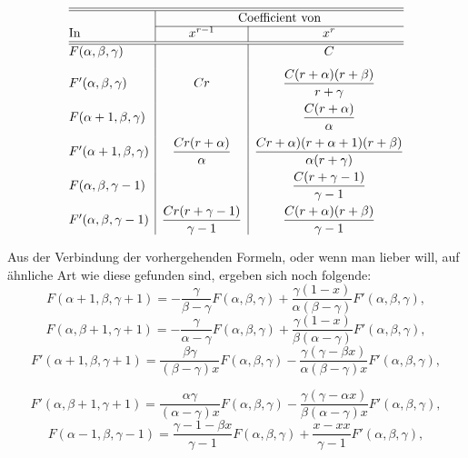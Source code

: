 \begingroup\renewcommand{\arraystretch}{1.45}
\[\begin{array}{@{}l|c|c@{}}
\hline\hline
&\multicolumn{2}{c}{\text{Coefficient von}}\\\cline{2-3}
\text{In}&x^{r-1}&x^r\\\hline\hline
F(\alpha,\beta,\gamma)&&C\\[.7em]
F'(\alpha,\beta,\gamma)&Cr&\dfrac{C(r+\alpha)(r+\beta)}{r+\gamma}\\[.9em]
F(\alpha+1,\beta,\gamma)&&\dfrac{C(r+\alpha)}{\alpha}\\[.9em]
F'(\alpha+1,\beta,\gamma)&\dfrac{Cr(r+\alpha)}{\alpha}&\dfrac{Cr+\alpha)(r+\alpha+1)(r+\beta)}{\alpha(r+\gamma)}\\[.9em]
F(\alpha,\beta,\gamma-1)&&\dfrac{C(r+\gamma-1)}{\gamma-1}\\[.9em]
F'(\alpha,\beta,\gamma-1)&\dfrac{Cr(r+\gamma-1)}{\gamma-1}&\dfrac{C(r+\alpha)(r+\beta)}{\gamma-1}
\end{array}\]
\endgroup
\par\indent Aus der Verbindung der vorhergehenden Formeln, oder wenn man lieber will, auf ähnliche Art wie diese gefunden sind, ergeben sich noch folgende:
\begin{equation}
F(\alpha+1,\beta,\gamma+1)=-\frac{\gamma}{\beta-\gamma}F(\alpha,\beta,\gamma)+\frac{\gamma(1-x)}{\alpha(\beta-\gamma)}F'(\alpha,\beta,\gamma),\tag*{(14)}
\end{equation}
\begin{equation}
F(\alpha,\beta+1,\gamma+1)=-\frac{\gamma}{\alpha-\gamma}F(\alpha,\beta,\gamma)+\frac{\gamma(1-x)}{\beta(\alpha-\gamma)}F'(\alpha,\beta,\gamma),\tag*{(15)}
\end{equation}
\begin{equation}
F'(\alpha+1,\beta,\gamma+1)=\frac{\beta\gamma}{(\beta-\gamma)x}F(\alpha,\beta,\gamma)-\frac{\gamma(\gamma-\beta x)}{\alpha(\beta-\gamma)x}F'(\alpha,\beta,\gamma),\tag*{(16)}
\end{equation}
\par\smallskip\noindent{\small[S. 39]}\par
\begin{equation}
F'(\alpha,\beta+1,\gamma+1)=\frac{\alpha\gamma}{(\alpha-\gamma)x}F(\alpha,\beta,\gamma)-\frac{\gamma(\gamma-\alpha x)}{\beta(\alpha-\gamma)x}F'(\alpha,\beta,\gamma),\tag*{(17)}
\end{equation}
\begin{equation}
F(\alpha-1,\beta,\gamma-1)=\frac{\gamma-1-\beta x}{\gamma-1}F(\alpha,\beta,\gamma)+\frac{x-xx}{\gamma-1}F'(\alpha,\beta,\gamma),\tag*{(18)}
\end{equation}
